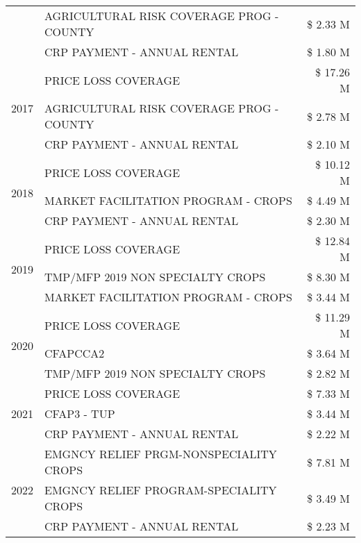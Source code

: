 \begin{tabular}{llr}
 & AGRICULTURAL RISK COVERAGE PROG - COUNTY & \$ 2.33 M \\
 & CRP PAYMENT - ANNUAL RENTAL & \$ 1.80 M \\
\cline{1-3}
\multirow[t]{3}{*}{2017} & PRICE LOSS COVERAGE & \$ 17.26 M \\
 & AGRICULTURAL RISK COVERAGE PROG - COUNTY & \$ 2.78 M \\
 & CRP PAYMENT - ANNUAL RENTAL & \$ 2.10 M \\
\cline{1-3}
\multirow[t]{3}{*}{2018} & PRICE LOSS COVERAGE & \$ 10.12 M \\
 & MARKET FACILITATION PROGRAM - CROPS & \$ 4.49 M \\
 & CRP PAYMENT - ANNUAL RENTAL & \$ 2.30 M \\
\cline{1-3}
\multirow[t]{3}{*}{2019} & PRICE LOSS COVERAGE & \$ 12.84 M \\
 & TMP/MFP 2019 NON SPECIALTY CROPS & \$ 8.30 M \\
 & MARKET FACILITATION PROGRAM - CROPS & \$ 3.44 M \\
\cline{1-3}
\multirow[t]{3}{*}{2020} & PRICE LOSS COVERAGE & \$ 11.29 M \\
 & CFAPCCA2 & \$ 3.64 M \\
 & TMP/MFP 2019 NON SPECIALTY CROPS & \$ 2.82 M \\
\cline{1-3}
\multirow[t]{3}{*}{2021} & PRICE LOSS COVERAGE & \$ 7.33 M \\
 & CFAP3 - TUP & \$ 3.44 M \\
 & CRP PAYMENT - ANNUAL RENTAL & \$ 2.22 M \\
\cline{1-3}
\multirow[t]{3}{*}{2022} & EMGNCY RELIEF PRGM-NONSPECIALITY CROPS & \$ 7.81 M \\
 & EMGNCY RELIEF PROGRAM-SPECIALITY CROPS & \$ 3.49 M \\
 & CRP PAYMENT - ANNUAL RENTAL & \$ 2.23 M \\
\cline{1-3}
\bottomrule
\end{tabular}
